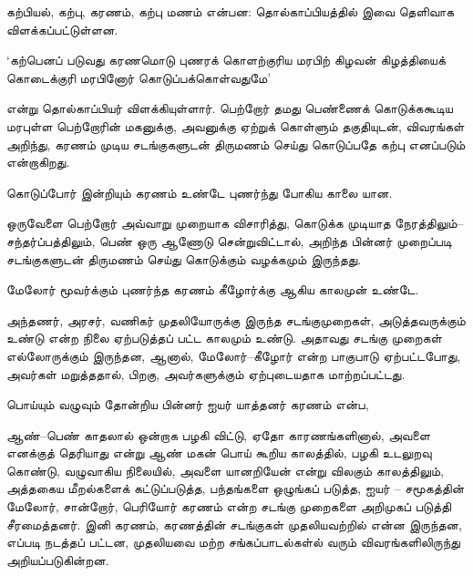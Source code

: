 கற்பியல், கற்பு, கரணம், கற்பு மணம் என்பன: தொல்காப்பியத்தில் இவை தெளிவாக விளக்கப்பட்டுள்ளன.

‘கற்பெனப் படுவது கரணமொடு புணரக் கொளற்குரிய மரபிற் கிழவன் கிழத்தியைக் கொடைக்குரி மரபினோர் கொடுப்பக்கொள்வதுமே' 

என்று தொல்காப்பியர் விளக்கியுள்ளார். பெற்றோர் தமது பெண்ணைக் கொடுக்ககூடிய மரபுள்ள பெற்றோரின் மகனுக்கு, அவனுக்கு ஏற்றுக் கொள்ளும் தகுதியுடன், விவரங்கள் அறிந்து, கரணம் முடிய சடங்குகளுடன் திருமணம் செய்து கொடுப்பதே கற்பு எனப்படும் என்றாகிறது.

கொடுப்போர் இன்றியும் கரணம் உண்டே புணர்ந்து போகிய காலை யான.

ஒருவேளை பெற்றோர் அவ்வாறு முறையாக விசாரித்து, கொடுக்க முடியாத நேரத்திலும்–சந்தர்ப்பத்திலும், பெண் ஒரு ஆணோடு சென்றுவிட்டால், அறிந்த பின்னர் முறைப்படி சடங்குகளுடன் திருமணம் செய்து கொடுக்கும் வழக்கமும் இருந்தது.

மேலோர் மூவர்க்கும் புணர்ந்த கரணம் கீழோர்க்கு ஆகிய காலமுன் உண்டே.

அந்தணர், அரசர், வணிகர் முதலியோருக்கு இருந்த சடங்குமுறைகள், அடுத்தவருக்கும் உண்டு என்ற நிலை ஏற்படுத்தப் பட்ட காலமும் உண்டு. அதாவது சடங்கு முறைகள் எல்லோருக்கும் இருந்தன, ஆனால், மேலோர்–கீழோர் என்ற பாகுபாடு ஏற்பட்டபோது, அவர்கள் மறுத்ததால், பிறகு, அவர்களுக்கும் ஏற்புடையதாக மாற்றப்பட்டது.

பொய்யும் வழுவும் தோன்றிய பின்னர் ஐயர் யாத்தனர் கரணம் என்ப,

ஆண்–பெண் காதலால் ஒன்றாக பழகி விட்டு, ஏதோ காரணங்களினால், அவளை எனக்குத் தெரியாது என்று ஆண் மகன் பொய் கூறிய காலத்தில், பழகி உடலுறவு கொண்டு, வழுவாகிய நிலையில், அவளை யானறியேன் என்று விலகும் காலத்திலும், அத்தகைய மீறல்களைக் கட்டுப்படுத்த, பந்தங்களை ஒழுங்கப் படுத்த, ஐயர் – சமூகத்தின் மேலோர், சான்றோர், பெரியோர் கரணம் என்ற சடங்கு முறைகளை அறிமுகப் படுத்தி சீரமைத்தனர். இனி கரணம், கரணத்தின் சடங்குகள் முதலியவற்றில் என்ன இருந்தன, எப்படி நடத்தப் பட்டன, முதலியவை மற்ற சங்கப்பாடல்கள்ல் வரும் விவரங்களிலிருந்து அறியப்படுகின்றன.

